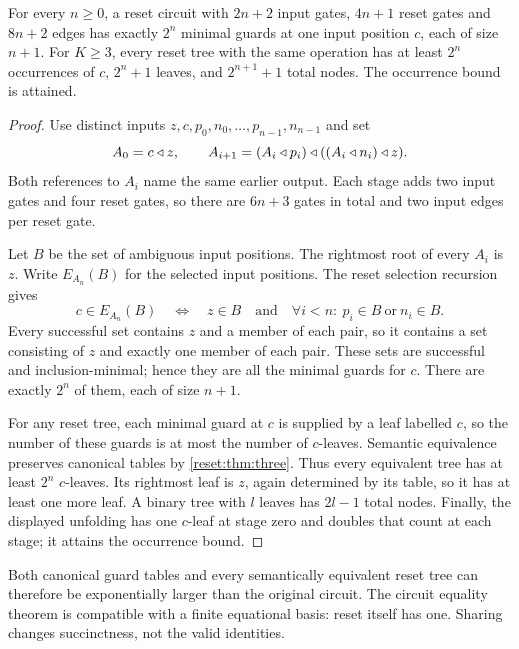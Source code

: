 \begin{proposition}\label{reset:prop:large-circuit-table}
For every $n\geq0$, a reset circuit with $2n+2$ input gates,
$4n+1$ reset gates and $8n+2$ edges has exactly $2^n$
minimal guards at one input position $c$, each of size $n+1$.
For $K\geq3$, every reset tree with the same operation has at least
$2^n$ occurrences of $c$, $2^n+1$ leaves, and $2^{n+1}+1$ total
nodes. The occurrence bound is attained.
\end{proposition}
\begin{proof}
Use distinct inputs $z,c,p_0,n_0,\ldots,p_{n-1},n_{n-1}$ and set
\[
 A_0=c\mathbin{\triangleleft} z,\qquad
 A_{i+1}=(A_i\mathbin{\triangleleft} p_i)\mathbin{\triangleleft}((A_i\mathbin{\triangleleft} n_i)\mathbin{\triangleleft} z).
\]
Both references to $A_i$ name the same earlier output. Each stage
adds two input gates and four reset gates, so there are $6n+3$
gates in total and two input edges per reset gate.

Let $B$ be the set of ambiguous input positions. The rightmost root
of every $A_i$ is $z$. Write $E_{A_n}(B)$ for the selected input
positions. The reset selection recursion gives
\[
 c\in E_{A_n}(B)
 \quad\Longleftrightarrow\quad
 z\in B\quad\text{and}\quad
 \forall i<n:\ p_i\in B\ \text{or}\ n_i\in B.
\]
Every successful set contains $z$ and a member of each pair, so it
contains a set consisting of $z$ and exactly one member of each pair.
These sets are successful and inclusion-minimal; hence they are all
the minimal guards for $c$. There are exactly $2^n$ of them, each
of size $n+1$.

For any reset tree, each minimal guard at $c$ is supplied by a leaf
labelled $c$, so the number of these guards is at most the number of
$c$-leaves. Semantic equivalence preserves canonical tables by
\cref{reset:thm:three}. Thus every equivalent tree has at least $2^n$
$c$-leaves. Its rightmost leaf is $z$, again determined by its table,
so it has at least one more leaf. A binary tree with $l$ leaves has
$2l-1$ total nodes. Finally, the displayed unfolding has one
$c$-leaf at stage zero and doubles that count at each stage; it
attains the occurrence bound.
\end{proof}

Both canonical guard tables and every semantically equivalent reset
tree can therefore be exponentially larger than the original circuit. The circuit equality theorem is compatible
with a finite equational basis: reset itself has one. Sharing changes
succinctness, not the valid identities.
